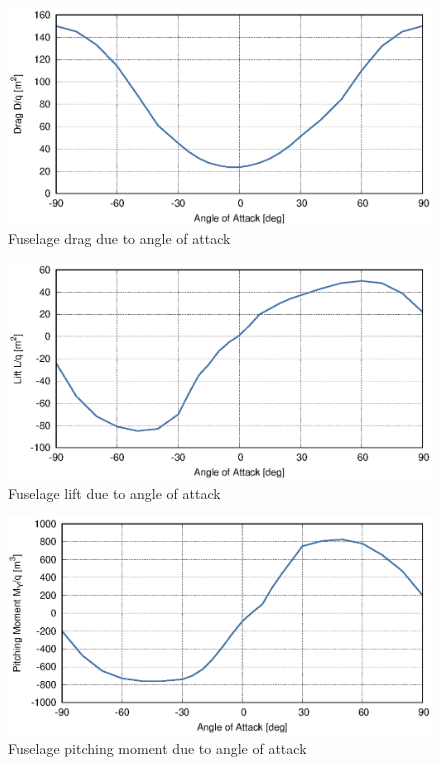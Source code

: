 \begin{figure}
  \centering
  \includegraphics[width=140mm]{eps/uh60_fuselage_alpha_cx.eps}
  \caption{Fuselage drag due to angle of attack \cite{NASA-CR-166309}}
\end{figure}

\begin{figure}
  \centering
  \includegraphics[width=140mm]{eps/uh60_fuselage_alpha_cz.eps}
  \caption{Fuselage lift due to angle of attack \cite{NASA-CR-166309}}
\end{figure}

\begin{figure}
  \centering
  \includegraphics[width=140mm]{eps/uh60_fuselage_alpha_cm.eps}
  \caption{Fuselage pitching moment due to angle of attack \cite{NASA-CR-166309}}
\end{figure}


